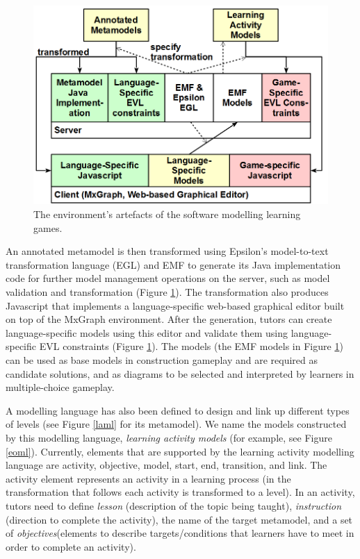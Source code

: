 \documentclass[12pt, a4paper]{report} \usepackage[titletoc]{appendix}
\begin{document}
\begin{figure}[t!]
\centering
\includegraphics[width=12cm]{artefacts}
\caption{The environment's artefacts of the software modelling learning games.}
\label{artefacts}
\end{figure}


An annotated metamodel is then transformed using Epsilon's model-to-text transformation language (EGL) \cite{kolovos2010epsilon} and EMF \cite{steinberg2008emf} to generate its Java implementation code for further model management operations on the server, such as model validation and transformation (Figure \ref{artefacts}). The transformation also produces Javascript that implements a language-specific web-based graphical editor built on top of the MxGraph environment. After the generation, tutors can create language-specific models using this editor and validate them using language-specific EVL \cite{kolovos2006eclipse} constraints (Figure \ref{artefacts}). The models (the EMF models in Figure \ref{artefacts}) can be used as base models in construction gameplay and are required as candidate solutions, and as diagrams to be selected and interpreted by learners in multiple-choice gameplay. 

A modelling language has also been defined to design and link up different types of levels (see Figure \ref{laml} for its metamodel). We name the models constructed by this modelling language, \emph{learning activity models} (for example, see Figure \ref{eoml}). Currently, elements that are supported by the learning activity modelling language are activity, objective, model, start, end, transition, and link. The activity element represents an activity in a learning process (in the transformation that follows each activity is transformed to a level). In an activity, tutors need to define \emph{lesson} (description of the topic being taught), \emph{instruction} (direction to complete the activity), the name of the target metamodel, and a set of \emph{objectives}(elements to describe targets/conditions that learners have to meet in order to complete an activity). 
\end{document}
